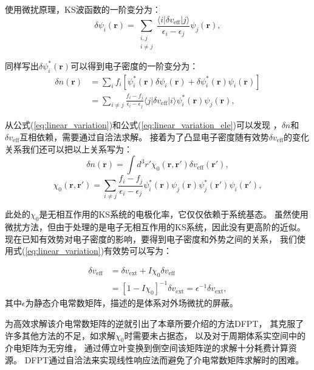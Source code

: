 使用微扰原理，KS波函数的一阶变分为：
\begin{equation}
  \delta \psi_i(\bm{r}) = \sum_{\substack{i,j\\i\neq j}} \frac{\langle i |\delta v_{\mathrm{eff}}|j \rangle}{\epsilon_i-\epsilon_j} \psi_j(\bm{r}) ,
\end{equation}

同样写出$\delta \psi_i^*(\bm{r})$可以得到电子密度的一阶变分为：
\begin{align}\label{eq:linear_variation_ele}
  \delta n(\bm{r}) &= \sum_i f_i [\psi_i^*(\bm{r})\delta \psi_i(\bm{r}) + \delta \psi_i^*(\bm{r}) \psi_i(\bm{r})] \\
  &= \sum_{i\neq j} \frac{f_i-f_j}{\epsilon_i-\epsilon_j} \langle j| \delta v_\mathrm{eff} | i \rangle \psi_i^*(\bm{r}) \psi_j(\bm{r}) ,
\end{align}

从公式(\ref{eq:linear_variation})和公式(\ref{eq:linear_variation_ele})可以发现
，$\delta n$和$\delta v_\mathrm{eff}$互相依赖，需要通过自洽法求解。
接着为了凸显电子密度随有效势$\delta v_\mathrm{eff}$的变化关系我们还可以把以上关系写为：
\begin{equation}
  \delta n(\bm{r}) = \int d^3 r' \chi_0 (\bm{r},\bm{r'})\delta v_\mathrm{eff}(\bm{r'}) ,
\end{equation}
\begin{equation}
  \chi_0(\bm{r},\bm{r'}) = \sum_{i\neq j}\frac{f_i-f_j}{\epsilon_i-\epsilon_j} \psi^*_i(\bm{r})\psi_j(\bm{r})\psi^*_j(\bm{r'})\psi_i(\bm{r'}) ,
\end{equation}

此处的$\chi_0$是无相互作用的KS系统的电极化率，它仅仅依赖于系统基态。
虽然使用微扰方法，但由于处理的是电子无相互作用的KS系统，因此没有更高阶的近似。
现在已知有效势对电子密度的影响，要得到电子密度和外势之间的关系，
我们使用式(\ref{eq:linear_variation})有效势可以写为：

\begin{align}
  \delta v_\mathrm{eff} &= \delta v_\mathrm{ext} + I \chi_0 \delta v_\mathrm{eff} \\
  &= [1-I\chi_0]^{-1} \delta v_\mathrm{ext} = \epsilon^{-1} \delta v_\mathrm{ext} ,
\end{align}
其中$\epsilon$为静态介电常数矩阵，描述的是体系对外场微扰的屏蔽。

为高效求解该介电常数矩阵的逆就引出了本章所要介绍的方法DFPT，
其克服了许多其他方法的不足，如求解$\chi_0$时需要未占据态，
以及对于周期体系实空间中的介电矩阵为无穷维，
通过傅立叶变换到倒空间该矩阵逆的求解十分耗费计算资源。
DFPT通过自洽法来实现线性响应法而避免了介电常数矩阵求解时的困难。

